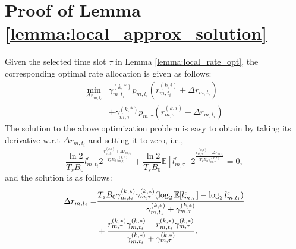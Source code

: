 \section{ Proof of Lemma \ref{lemma:local_approx_solution} }
\label{append_2}
Given the selected time slot $\tau$ in Lemma \ref{lemma:local_rate_opt}, the corresponding optimal rate allocation is given as follows:
\begin{align*}
    \min_{ \Delta{r}_{m,t_i} } &\gamma^{(k,*)}_{m,t_i} p_{m,t_i}( r^{(k,i)}_{m,t_i} + \Delta{r}_{m,t_i} )
    \nonumber\\
    &+ \gamma^{(k,*)}_{m,\tau} p_{m,\tau}( r^{(k,i)}_{m,\tau} - \Delta{r}_{m,t_i} )
\end{align*}
The solution to the above optimization problem is easy to obtain by taking its derivative w.r.t $\Delta{r}_{m,t_i}$ and setting it to zero, i.e.,
$$
\frac{\ln{2}}{T_sB_0} l^{\epsilon}_{m,t_i} 2^{\frac{r^{(k,i)}_{m,t_i} + \Delta{r}_{m,t_i}}{T_sB_0 \gamma^{(k,*)}_{m,t_i}}}
+ \frac{\ln{2}}{T_sB_0} \mathbb{E}[l^{\epsilon}_{m,\tau}] 2^{\frac{r^{(k,i)}_{m,\tau} - \Delta{r}_{m,t_i}}{T_sB_0 \gamma^{(k,*)}_{m,\tau}}} = 0,
$$
and the solution is as follows:
\begin{align*}
    \Delta{r}_{m,t_i} =
    &\frac{
        T_sB_0 \gamma^{(k,*)}_{m,t_i} \gamma^{(k,*)}_{m,\tau} ( \log_2{ \mathbb{E}[l^{\epsilon}_{m,\tau}] } - \log_2{l^{\epsilon}_{m,t_i}} ) 
    }{
        \gamma^{(k,*)}_{m,t_i} + \gamma^{(k,*)}_{m,\tau}
    }
    \nonumber\\
    &+ \frac{
        r^{(k,*)}_{m,\tau}\gamma^{(k,*)}_{m,t_i} - r^{(k,*)}_{m,t_i}\gamma^{(k,*)}_{m,\tau} 
    }{
        \gamma^{(k,*)}_{m,t_i} + \gamma^{(k,*)}_{m,\tau}
    }.
\end{align*}

